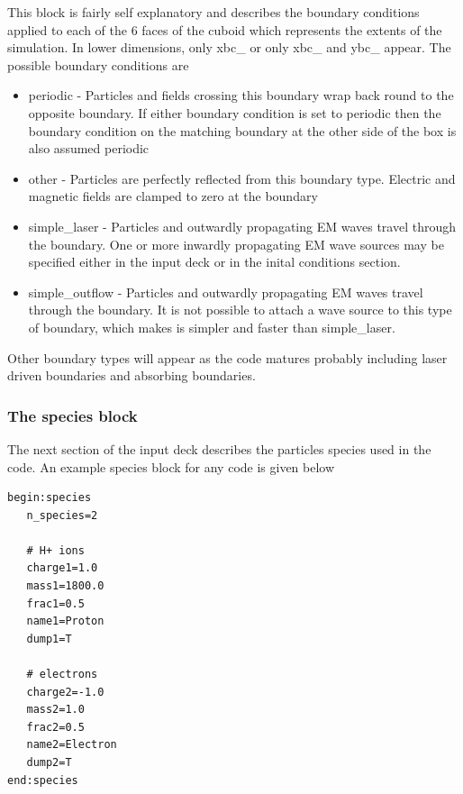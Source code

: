 \documentclass[12pt,a4paper]{article}
\newcommand{\simpleboxverbatim}{\begin{Verbatim}[obeytabs=true,frame=single,
  framerule=0.5mm,rulecolor=\color{warwickmid},formatcom=\color{black}]}
\newcommand{\EPOCH}{{\color{warwickdark}\fontfamily{phv}\selectfont{EPOCH}}}
\begin{document}
This block is fairly self explanatory and describes the boundary conditions
applied to each of the 6 faces of the cuboid which represents the extents of
the simulation. In lower dimensions, only xbc\_ or only xbc\_ and ybc\_
appear. The possible boundary conditions are\\
\begin{itemize}
\item periodic - Particles and fields crossing this boundary wrap back round
  to the opposite boundary. If either boundary condition is set to periodic
  then the boundary condition on the matching boundary at the other side of
  the box is also assumed periodic
\item other - Particles are perfectly reflected from this boundary
  type. Electric and magnetic fields are clamped to zero at the boundary
\item simple\_laser - Particles and outwardly propagating EM waves travel
  through the boundary. One or more inwardly propagating EM wave sources may
  be specified either in the input deck or in the inital conditions section.
\item simple\_outflow - Particles and outwardly propagating EM waves travel
  through the boundary. It is not possible to attach a wave source to this
  type of boundary, which makes is simpler and faster than simple\_laser.
\end{itemize}
Other boundary types will appear as the code matures probably including laser
driven boundaries and absorbing boundaries.\\

\subsubsection{The species block}
The next section of the input deck describes the particles species used in the
code. An example species block for any {\EPOCH} code is given below\\
\simpleboxverbatim
begin:species
   n_species=2

   # H+ ions
   charge1=1.0
   mass1=1800.0
   frac1=0.5
   name1=Proton
   dump1=T

   # electrons
   charge2=-1.0
   mass2=1.0
   frac2=0.5
   name2=Electron
   dump2=T
end:species
\end{Verbatim}
\end{document}

